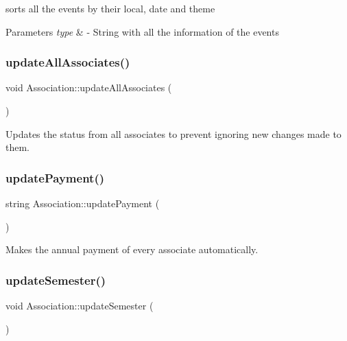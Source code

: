 sorts all the events by their local, date and theme 


\begin{DoxyParams}{Parameters}
{\em type} & -\/ String with all the information of the events \\
\hline
\end{DoxyParams}
\mbox{\label{classAssociation_aafcd73622038c5174a70b1c03041810d}} 
\subsubsection{\texorpdfstring{update\+All\+Associates()}{updateAllAssociates()}}
{\footnotesize\ttfamily void Association\+::update\+All\+Associates (\begin{DoxyParamCaption}{ }\end{DoxyParamCaption})}



Updates the status from all associates to prevent ignoring new changes made to them. 

\mbox{\label{classAssociation_afd8dd744fba29817387841f4b6870c2d}} 
\subsubsection{\texorpdfstring{update\+Payment()}{updatePayment()}}
{\footnotesize\ttfamily string Association\+::update\+Payment (\begin{DoxyParamCaption}{ }\end{DoxyParamCaption})}



Makes the annual payment of every associate automatically. 

\mbox{\label{classAssociation_aa018edd1d345ca144f648096df9e9bf4}} 
\subsubsection{\texorpdfstring{update\+Semester()}{updateSemester()}}
{\footnotesize\ttfamily void Association\+::update\+Semester (\begin{DoxyParamCaption}{ }\end{DoxyParamCaption})}



